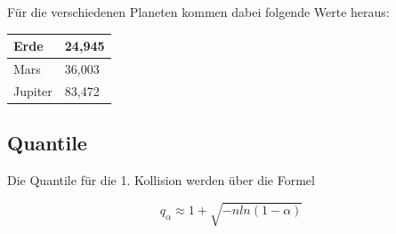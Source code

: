 \documentclass[../main.tex]{subfiles}
\begin{document}
Für die verschiedenen Planeten kommen dabei folgende Werte heraus:

\begin{center}
\begin{tabular}{l|l}
Erde & 24,945\\ \hline
Mars & 36,003\\ \hline
Jupiter & 83,472
\end{tabular}
\end{center}

\subsection{Quantile}

Die Quantile für die 1. Kollision werden über die Formel

\begin{equation}
 q_{\alpha} \approx 1 + \sqrt{-n ln(1-\alpha)}
\end{equation}
\end{document}
